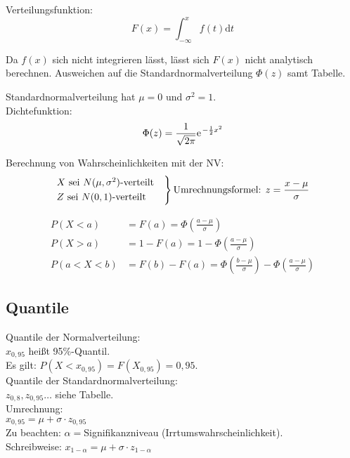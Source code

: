 Verteilungsfunktion:
\begin{equation}
	F(x) = \int_{-\infty}^xf(t)\mathrm{d}t
\end{equation}

Da $f(x)$ sich nicht integrieren lässt, lässt sich $F(x)$ nicht analytisch berechnen. Ausweichen auf die Standardnormalverteilung $\Phi(z)$ samt Tabelle.

Standardnormalverteilung hat $\mu=0$ und $\sigma^2=1$.\\
Dichtefunktion:
\begin{equation}
	\Phi(z) = \frac{1}{\sqrt{2\pi}}\e^{-\frac{1}{2}x^2}
\end{equation}

Berechnung von Wahrscheinlichkeiten mit der NV:\\
\begin{align}
	\begin{rcases}
		X \text{ sei } N(\mu, \sigma^2)\text{-verteilt} &\\
		Z \text{ sei } N(0,1)\text{-verteilt} &
	\end{rcases} \text{Umrechnungsformel: } z=\frac{x-\mu}{\sigma}
\end{align}

\begin{align}
	P(X < a) &= F(a) = \Phi\left(\frac{a-\mu}{\sigma}\right)\\
	P(X > a) &= 1-F(a) = 1-\Phi\left(\frac{a-\mu}{\sigma}\right)\\
	P(a < X < b) &= F(b) - F(a) = \Phi\left(\frac{b-\mu}{\sigma}\right) - \Phi\left(\frac{a-\mu}{\sigma}\right)
\end{align}

\subsection{Quantile}
Quantile der Normalverteilung:\\
$x_{0,95}$ heißt 95\%-Quantil.\\
Es gilt: $P(X < x_{0,95}) = F(X_{0,95}) = 0,95$.\\

Quantile der Standardnormalverteilung:\\
$z_{0,8}, z_{0,95}\dots$ siehe Tabelle.\\

Umrechnung:\\
$x_{0,95} = \mu +\sigma\cdot z_{0,95}$\\

Zu beachten: $\alpha=$Signifikanzniveau (Irrtumswahrscheinlichkeit).\\
Schreibweise: $x_{1-\alpha}=\mu+\sigma\cdot z_{1-\alpha}$

